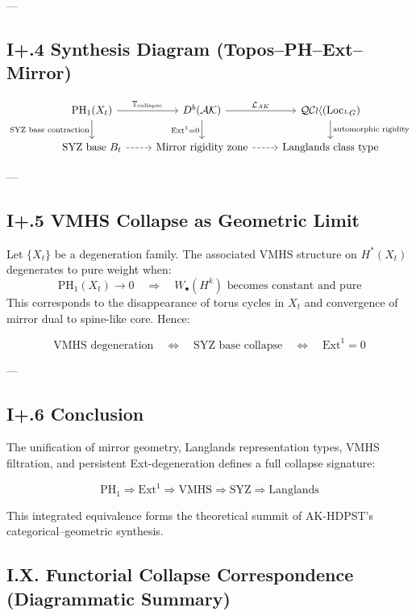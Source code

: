 \documentclass[11pt]{article}
\begin{document}
---

\subsection*{I+.4 Synthesis Diagram (Topos–PH–Ext–Mirror)}

\[
\begin{tikzcd}
\mathrm{PH}_1(X_t) \arrow[r, "\mathbb{T}_{\text{collapse}}"] \arrow[d, "\text{SYZ base contraction}"'] &
D^b(\mathcal{AK}) \arrow[r, "\mathcal{L}_{AK}"] \arrow[d, "\mathrm{Ext}^1 = 0"'] &
\mathcal{QCoh}(\mathrm{Loc}_{^LG}) \arrow[d, "\text{automorphic rigidity}"] \\
\text{SYZ base } B_t \arrow[r, dashed] &
\text{Mirror rigidity zone} \arrow[r, dashed] &
\text{Langlands class type}
\end{tikzcd}
\]

---

\subsection*{I+.5 VMHS Collapse as Geometric Limit}

Let \( \{X_t\} \) be a degeneration family. The associated VMHS structure on \( H^*(X_t) \) degenerates to pure weight when:
\[
\mathrm{PH}_1(X_t) \to 0 \quad \Rightarrow \quad W_\bullet(H^k) \text{ becomes constant and pure}
\]
This corresponds to the disappearance of torus cycles in \( X_t \) and convergence of mirror dual to spine-like core. Hence:

\[
\text{VMHS degeneration} \quad \Leftrightarrow \quad \text{SYZ base collapse} \quad \Leftrightarrow \quad \mathrm{Ext}^1 = 0
\]

---

\subsection*{I+.6 Conclusion}

The unification of mirror geometry, Langlands representation types, VMHS filtration, and persistent Ext-degeneration defines a full collapse signature:

\[
\boxed{
\mathrm{PH}_1 \Rightarrow \mathrm{Ext}^1 \Rightarrow \text{VMHS} \Rightarrow \text{SYZ} \Rightarrow \text{Langlands}
}
\]

This integrated equivalence forms the theoretical summit of AK-HDPST's categorical–geometric synthesis.

\subsection*{I.X. Functorial Collapse Correspondence (Diagrammatic Summary)}
\end{document}
